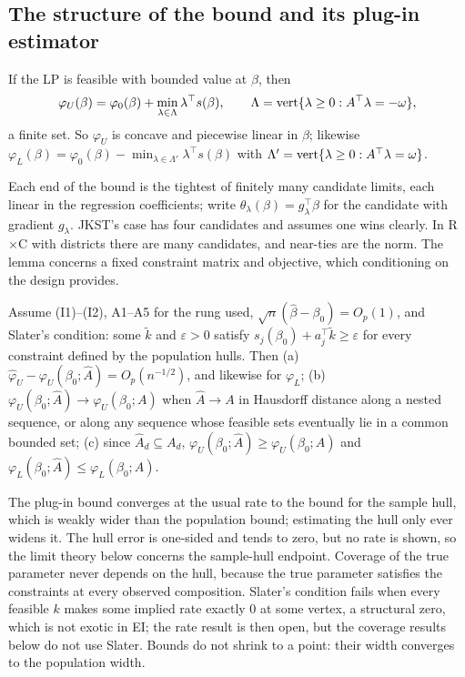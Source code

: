 \subsection{The structure of the bound and its plug-in estimator}

\begin{lemma}\label{lem:minlin}
If the LP is feasible with bounded value at $\beta$, then
\[
\varphi_U(\beta)=\varphi_0(\beta)+\min_{\lambda\in\Lambda}\lambda^\top s(\beta),\qquad
\Lambda=\operatorname{vert}\{\lambda\ge0:A^\top\lambda=-\omega\},
\]
a finite set. So $\varphi_U$ is concave and piecewise linear in $\beta$; likewise
$\varphi_L(\beta)=\varphi_0(\beta)-\min_{\lambda\in\Lambda'}\lambda^\top s(\beta)$ with
$\Lambda'=\operatorname{vert}\{\lambda\ge0:A^\top\lambda=\omega\}$.
\end{lemma}
\begin{reading}
Each end of the bound is the tightest of finitely many candidate limits, each
linear in the regression coefficients; write $\theta_\lambda(\beta)=g_\lambda^\top\beta$
for the candidate with gradient $g_\lambda$. JKST's case has four candidates and
assumes one wins clearly. In R$\times$C with districts there are many candidates,
and near-ties are the norm. The lemma concerns a fixed constraint matrix and
objective, which conditioning on the design provides.
\end{reading}

\begin{proposition}\label{prop:consistency}
Assume (I1)--(I2), A1--A5 for the rung used, $\sqrt n(\hat\beta-\beta_0)=O_p(1)$,
and Slater's condition: some $\tilde k$ and $\varepsilon>0$ satisfy
$s_j(\beta_0)+a_j^\top\tilde k\ge\varepsilon$ for every constraint defined by the
population hulls. Then (a) $\hat\varphi_U-\varphi_U(\beta_0;\hat A)=O_p(n^{-1/2})$,
and likewise for $\varphi_L$; (b) $\varphi_U(\beta_0;\hat A)\to\varphi_U(\beta_0;A)$
when $\hat A\to A$ in Hausdorff distance along a nested sequence, or along any
sequence whose feasible sets eventually lie in a common bounded set; (c) since
$\hat A_d\subseteq A_d$, $\varphi_U(\beta_0;\hat A)\ge\varphi_U(\beta_0;A)$ and
$\varphi_L(\beta_0;\hat A)\le\varphi_L(\beta_0;A)$.
\end{proposition}
\begin{reading}
The plug-in bound converges at the usual rate to the bound for the sample hull,
which is weakly wider than the population bound; estimating the hull only ever
widens it. The hull error is one-sided and tends to zero, but no rate is shown, so
the limit theory below concerns the sample-hull endpoint. Coverage of the true
parameter never depends on the hull, because the true parameter satisfies the
constraints at every observed composition. Slater's condition fails when every
feasible $k$ makes some implied rate exactly 0 at some vertex, a structural zero,
which is not exotic in EI; the rate result is then open, but the coverage results
below do not use Slater. Bounds do not shrink to a point: their width converges to
the population width.
\end{reading}

